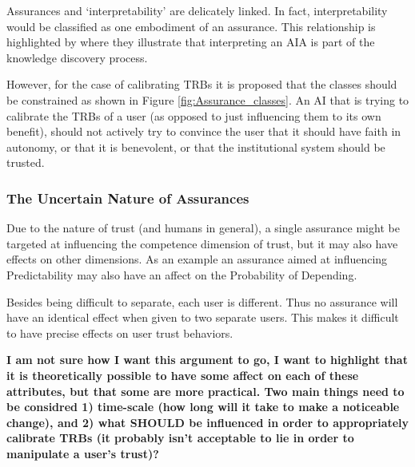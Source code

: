     Assurances and `interpretability' are delicately linked. In fact, interpretability would be classified as one embodiment of an assurance. This relationship is highlighted by \citet{Vellido2012-nm} where they illustrate that interpreting an AIA is part of the knowledge discovery process.

    
    
    
    

    However, for the case of calibrating TRBs it is proposed that the classes should be constrained as shown in Figure \ref{fig:Assurance_classes}. An AI that is trying to calibrate the TRBs of a user (as opposed to just influencing them to its own benefit), should not actively try to convince the user that it should have faith in autonomy, or that it is benevolent, or that the institutional system should be trusted.

    \subsubsection{The Uncertain Nature of Assurances}
        Due to the nature of trust (and humans in general), a single assurance might be targeted at influencing the competence dimension of trust, but it may also have effects on other dimensions. As an example an assurance aimed at influencing Predictability may also have an affect on the Probability of Depending.

        Besides being difficult to separate, each user is different. Thus no assurance will have an identical effect when given to two separate users. This makes it difficult to have precise effects on user trust behaviors.

        \textbf{I am not sure how I want this argument to go, I want to highlight that it is theoretically possible to have some affect on each of these attributes, but that some are more practical. Two main things need to be considred 1) time-scale (how long will it take to make a noticeable change), and 2) what SHOULD be influenced in order to appropriately calibrate TRBs (it probably isn't acceptable to lie in order to manipulate a user's trust)?}
